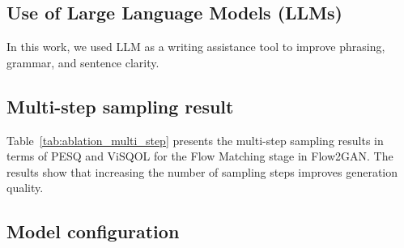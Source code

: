 \subsection{Use of Large Language Models (LLMs)}

In this work, we used LLM as a writing assistance tool to improve phrasing, grammar, and sentence clarity.

\subsection{Multi-step sampling result}

Table~\ref{tab:ablation_multi_step} presents the multi-step sampling results in terms of PESQ and ViSQOL for the Flow Matching stage in Flow2GAN. The results show that increasing the number of sampling steps improves generation quality.

\begin{table}[h!]
\centering
\caption{Multi-step results on LibriTTS dev set for the Flow Matching stage of Flow2GAN.}
\label{tab:ablation_multi_step}
\setlength{\tabcolsep}{6pt} %
\end{table}



\subsection{Model configuration}
\label{ssec:model_conf}


